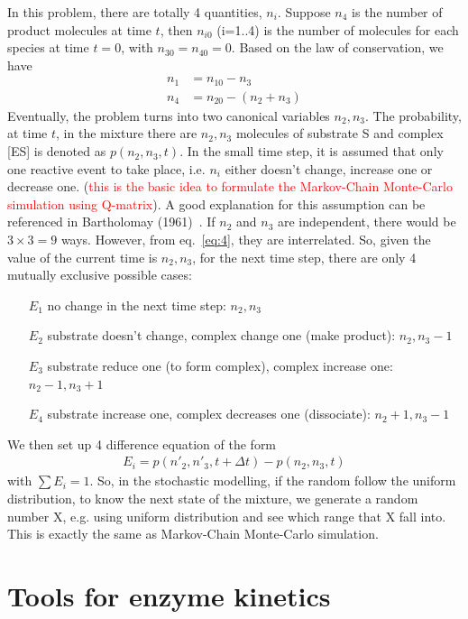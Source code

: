 In this problem, there are totally 4 quantities, $n_i$. Suppose $n_4$
is the number of product molecules at time $t$, then $n_{i0}$ (i=1..4)
is the number of molecules for each species at time $t=0$, with
$n_{30}=n_{40}=0$. Based on the law of conservation, we have
\begin{equation}
  \label{eq:4}
  \begin{split}
    n_1 &= n_{10} - n_3 \\
    n_4 &= n_{20} - (n_2+n_3)
  \end{split}
\end{equation}
Eventually, the problem turns into two canonical variables $n_2,n_3$.
The probability, at time $t$, in the mixture there are $n_2,n_3$
molecules of substrate S and complex [ES] is denoted as
$p(n_2,n_3,t)$.  In the small time step, it is assumed that only one
reactive event to take place, i.e. $n_i$ either doesn't change,
increase one or decrease one.
(\textcolor{red}{this is the basic idea to formulate the Markov-Chain
  Monte-Carlo simulation using Q-matrix}).
A good explanation for this assumption can be referenced in
Bartholomay (1961)~\citep{bartholomay1962errt}.  If $n_2$ and $n_3$ are
independent, there would be $3\times 3=9$ ways. However, from
eq.~\eqref{eq:4}, they are interrelated. So, given the value of the
current time is $n_2,n_3$, for the next time step, there are only 4
mutually exclusive possible cases:
\begin{enumerate}
\item [$E_1$] no change in the next time step: $n_2,n_3$
\item [$E_2$] substrate doesn't change, complex change one (make product):
  $n_2,n_3-1$
\item [$E_3$] substrate reduce one (to form complex), complex increase one:
  $n_2-1,n_3+1$
\item [$E_4$] substrate increase one, complex decreases one (dissociate):
  $n_2+1,n_3-1$
\end{enumerate}
We then set up 4 difference equation of the form
\begin{eqnarray*}
 E_i =  p(n'_2,n'_3,t+\Delta t) - p(n_2,n_3,t)
\end{eqnarray*}
with $\sum E_i = 1$. So, in the stochastic modelling, if the random
follow the uniform distribution, to know the next state of the
mixture, we generate a random number X, e.g. using uniform
distribution and see which range that X fall into. This is exactly the
same as Markov-Chain Monte-Carlo simulation. 

\section{Tools for enzyme kinetics}
\label{sec:tools-enzyme-kinet}


